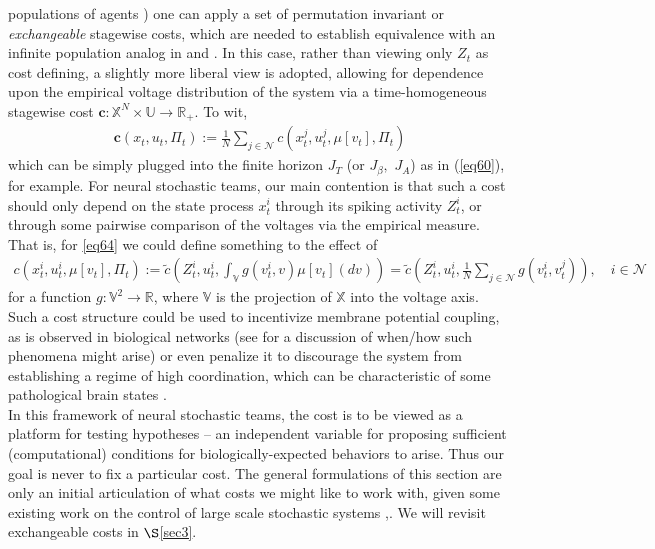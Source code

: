 \documentclass[12pt, oneside]{report}
\newcommand{\mbb}[1]{\mathbb{#1}}
\newcommand{\1}[1]{\mathbbm{1}_{\{#1\}}}
\newcommand{\mc}[1]{\mathcal{#1}}
\theoremstyle{definition}
\begin{document}
populations of agents \cite{Sanjari_Saldi_Yüksel_2024}) one can apply a set of permutation invariant or \textit{exchangeable} stagewise costs, which are needed to establish equivalence with an infinite population analog in \cite{Bauerle_2023} and \cite{Sanjari_Saldi_Yüksel_2023}. In this case, rather than viewing only $Z_t$ as cost defining, a slightly
more liberal view is adopted, allowing for dependence upon the empirical voltage distribution of the system via a time-homogeneous stagewise cost $\boldsymbol{c}:\mbb{X}^N\times\mbb{U}\rightarrow\mbb{R}_+$. To wit,
\begin{align}
    \boldsymbol{c}(x_t,u_t,\Pi_t):=\frac{1}{N}\sum_{j\in\mc{N}}c(x^j_t,u^j_t,\mu[v_t],\Pi_t)\label{eq64}
\end{align}
which can be simply plugged into the finite horizon $J_T$ (or $J_\beta,$ $J_A$) as in (\ref{eq60}), for example. For neural stochastic teams, our main contention is that such a cost should only depend on the state process $x^i_t$ through its spiking activity $Z^i_t$, or through some pairwise comparison of the voltages via the empirical measure. That is,
for \ref{eq64} we could define something to the effect of
\begin{align*}
    c(x^i_t,u^i_t,\mu[v_t],\Pi_t):=\tilde{c}\left(Z^i_t,u^i_t,\int_\mbb{V}g(v^i_t,v)\mu[v_t](dv)\right)=\tilde{c}\left(Z^i_t,u^i_t,\frac{1}{N}\sum_{j\in\mc{N}}g(v^i_t,v^j_t)\right),\quad i\in\mc{N}
\end{align*}
for a function $g:\mbb{V}^2\rightarrow\mbb{R}$, where $\mbb{V}$ is the
projection of $\mbb{X}$ into the voltage axis. Such a cost structure could be
used to incentivize membrane potential coupling, as is observed in biological
networks (see \cite{Denève_Machens_2016} for a discussion of when/how such
phenomena might arise) or even penalize it to discourage the system from
establishing a regime of high coordination, which can be characteristic of some
pathological brain states \cite{Uhlhaas_Singer_2006}.\\[5pt]
\indent In this framework of neural stochastic teams, the cost is to be viewed
as a platform for testing hypotheses -- an independent variable for proposing
sufficient (computational) conditions for biologically-expected behaviors to
arise. Thus our goal is never to fix a particular cost. The general formulations
of this section are only an initial articulation of what costs we might like to
work with, given some existing work on the control of large scale stochastic
systems \cite{Bauerle_2023},\cite{Sanjari_Saldi_Yüksel_2024}. We will revisit
exchangeable costs in $\S$\ref{sec3}.
\end{document}
